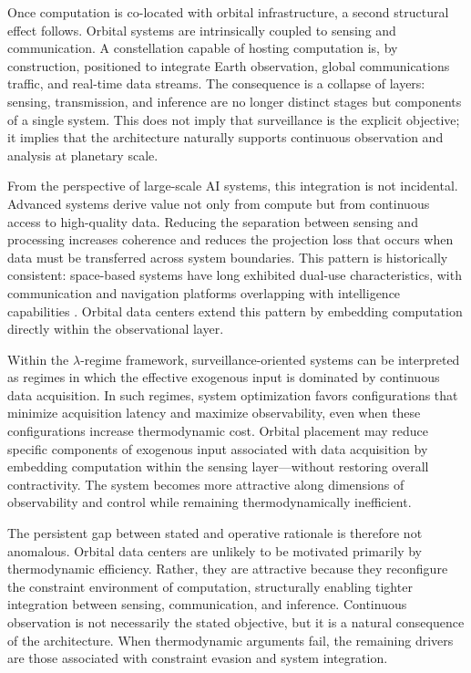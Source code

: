 \documentclass[11pt,a4paper]{article}
\theoremstyle{plain}
\theoremstyle{definition}
\theoremstyle{remark}
\begin{document}
Once computation is co-located with orbital infrastructure, a second structural
effect follows. Orbital systems are intrinsically coupled to sensing and
communication. A constellation capable of hosting computation is, by
construction, positioned to integrate Earth observation, global communications
traffic, and real-time data streams. The consequence is a collapse of layers:
sensing, transmission, and inference are no longer distinct stages but components
of a single system. This does not imply that surveillance is the explicit
objective; it implies that the architecture naturally supports continuous
observation and analysis at planetary scale.

From the perspective of large-scale AI systems, this integration is not
incidental. Advanced systems derive value not only from compute but from
continuous access to high-quality data. Reducing the separation between sensing
and processing increases coherence and reduces the projection loss that occurs
when data must be transferred across system boundaries. This pattern is
historically consistent: space-based systems have long exhibited dual-use
characteristics, with communication and navigation platforms overlapping with
intelligence capabilities \citep{zuboff2019,srnicek2017}. Orbital data centers
extend this pattern by embedding computation directly within the observational
layer.

Within the $\lambda$-regime framework, surveillance-oriented systems can be
interpreted as regimes in which the effective exogenous input is dominated by
continuous data acquisition. In such regimes, system optimization favors
configurations that minimize acquisition latency and maximize observability, even
when these configurations increase thermodynamic cost. Orbital placement may
reduce specific components of exogenous input associated with data acquisition
by embedding computation within the sensing layer---without restoring overall
contractivity. The system becomes more attractive along dimensions of
observability and control while remaining thermodynamically inefficient.

The persistent gap between stated and operative rationale is therefore not
anomalous. Orbital data centers are unlikely to be motivated primarily by
thermodynamic efficiency. Rather, they are attractive because they reconfigure
the constraint environment of computation, structurally enabling tighter
integration between sensing, communication, and inference. Continuous
observation is not necessarily the stated objective, but it is a natural
consequence of the architecture. When thermodynamic arguments fail, the remaining
drivers are those associated with constraint evasion and system integration.
\end{document}
